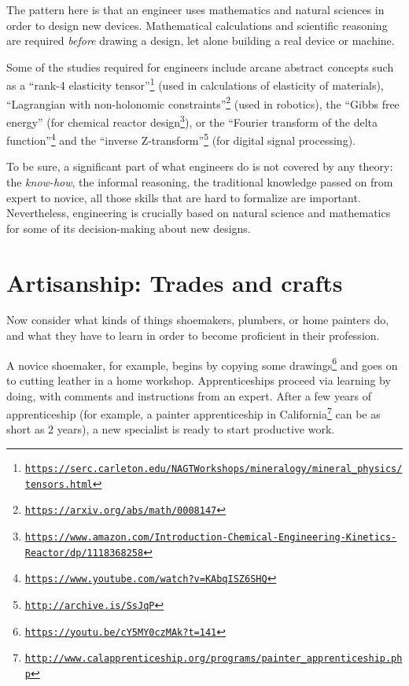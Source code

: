The pattern here is that an engineer uses mathematics and natural
sciences in order to design new devices. Mathematical calculations
and scientific reasoning are required \emph{before} drawing a design,
let alone building a real device or machine.

Some of the studies required for engineers include arcane abstract
concepts such as a ``rank-4 elasticity tensor''\footnote{\texttt{\href{https://serc.carleton.edu/NAGTWorkshops/mineralogy/mineral_physics/tensors.html}{https://serc.carleton.edu/NAGTWorkshops/mineralogy/mineral\_physics/tensors.html}}}
(used in calculations of elasticity of materials), ``Lagrangian with
non-holonomic constraints''\footnote{\texttt{\href{https://arxiv.org/abs/math/0008147}{https://arxiv.org/abs/math/0008147}}}
(used in robotics), the ``Gibbs free energy'' (for chemical reactor
design\footnote{\texttt{\href{https://www.amazon.com/Introduction-Chemical-Engineering-Kinetics-Reactor/dp/1118368258}{https://www.amazon.com/Introduction-Chemical-Engineering-Kinetics-Reactor/dp/1118368258}}}),
or the ``Fourier transform of the delta function''\footnote{\texttt{\href{https://www.youtube.com/watch?v=KAbqISZ6SHQ}{https://www.youtube.com/watch?v=KAbqISZ6SHQ}}}
and the ``inverse Z-transform''\footnote{\texttt{\href{http://archive.is/SsJqP}{http://archive.is/SsJqP}}}
(for digital signal processing).

To be sure, a significant part of what engineers do is not covered
by any theory: the \emph{know-how}, the informal reasoning, the traditional
knowledge passed on from expert to novice,  \textendash{}  all those
skills that are hard to formalize are important. Nevertheless, engineering
is crucially based on natural science and mathematics for some of
its decision-making about new designs.

\section{Artisanship: Trades and crafts }

Now consider what kinds of things shoemakers, plumbers, or home painters
do, and what they have to learn in order to become proficient in their
profession.

A novice shoemaker, for example, begins by copying some drawings\footnote{\texttt{\href{https://youtu.be/cY5MY0czMAk?t=141}{https://youtu.be/cY5MY0czMAk?t=141}}}
and goes on to cutting leather in a home workshop. Apprenticeships
proceed via learning by doing, with comments and instructions from
an expert. After a few years of apprenticeship (for example, a painter
apprenticeship in California\footnote{\texttt{\href{http://www.calapprenticeship.org/programs/painter_apprenticeship.php}{http://www.calapprenticeship.org/programs/painter\_apprenticeship.php}}}
can be as short as 2 years), a new specialist is ready to start productive
work. 

